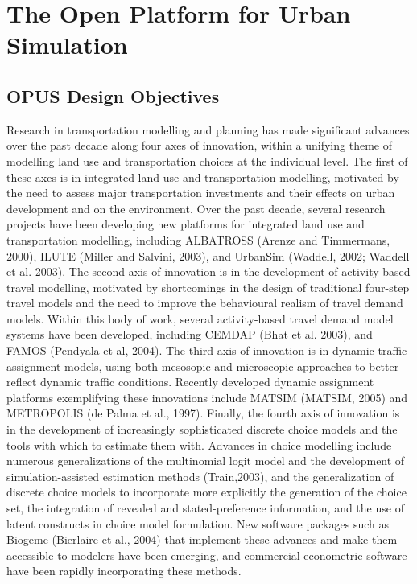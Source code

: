 \chapter{The Open Platform for Urban Simulation}

\section{OPUS Design Objectives}

Research in transportation modelling and planning has made significant advances over the past decade along four axes of innovation, within a unifying theme of modelling land use and transportation choices at the individual level. The first of these axes is in integrated land use and transportation modelling, motivated by the need to assess major transportation investments and their effects on urban development and on the environment.  Over the past decade, several research projects have been developing new platforms for integrated land use and transportation modelling, including ALBATROSS (Arenze and Timmermans, 2000), ILUTE (Miller and Salvini, 2003), and UrbanSim (Waddell, 2002; Waddell et al. 2003).  
The second axis of innovation is in the development of activity-based travel modelling, motivated by shortcomings in the design of traditional four-step travel models and the need to improve the behavioural realism of travel demand models.  Within this body of work, several activity-based travel demand model systems have been developed, including CEMDAP (Bhat et al. 2003), and FAMOS (Pendyala et al, 2004).  
The third axis of innovation is in dynamic traffic assignment models, using both mesosopic and microscopic approaches to better reflect dynamic traffic conditions.  Recently developed dynamic assignment platforms exemplifying these innovations include MATSIM (MATSIM, 2005) and METROPOLIS (de Palma et al., 1997).  
Finally, the fourth axis of innovation is in the development of increasingly sophisticated discrete choice models and the tools with which to estimate them with.  Advances in choice modelling include numerous generalizations of the multinomial logit model and the development of simulation-assisted estimation methods (Train,2003), and the generalization of discrete choice models to incorporate more explicitly the generation of the choice set, the integration of revealed and stated-preference information, and the use of latent constructs in choice model formulation.  New software packages such as Biogeme (Bierlaire et al., 2004) that implement these advances and make them accessible to modelers have been emerging, and commercial econometric software have been rapidly incorporating these methods.

